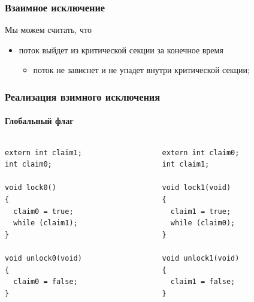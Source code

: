 \begin{frame}
\frametitle{Взаимное исключение}

Мы можем считать, что
\begin{itemize}
  \item поток выйдет из критической секции за конечное время
        \begin{itemize}
          \item поток не зависнет и не упадет внутри критической секции;
        \end{itemize}
\end{itemize}

\end{frame}

\begin{frame}[fragile]
\frametitle{Реализация взимного исключения}
\framesubtitle{Глобальный флаг}

\begin{columns}[T]
  \begin{column}{.45\linewidth}
    \begin{lstlisting}
extern int claim1;
int claim0;

void lock0()
{
  claim0 = true;
  while (claim1);
}

void unlock0(void)
{
  claim0 = false;
}
    \end{lstlisting}
  \end{column}
  \begin{column}{.45\linewidth}
    \begin{lstlisting}
extern int claim0;
int claim1;

void lock1(void)
{
  claim1 = true;
  while (claim0);
}

void unlock1(void)
{
  claim1 = false;
}
    \end{lstlisting}
  \end{column}
\end{columns}
\end{frame}

